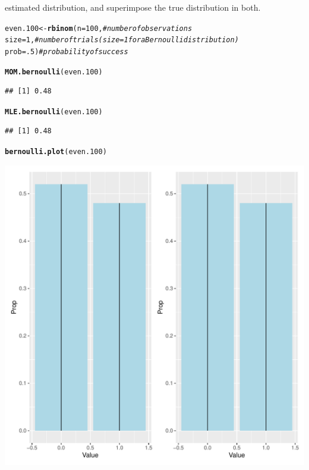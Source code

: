 \documentclass{article}\usepackage[]{graphicx}\usepackage[]{color}
\makeatletter
\def\maxwidth{ %
  \ifdim\Gin@nat@width>\linewidth
    \linewidth
  \else
    \Gin@nat@width
  \fi
}
\newcommand{\hlnum}[1]{\textcolor[rgb]{0.686,0.059,0.569}{#1}}%
\newcommand{\hlcom}[1]{\textcolor[rgb]{0.678,0.584,0.686}{\textit{#1}}}%
\newcommand{\hlstd}[1]{\textcolor[rgb]{0.345,0.345,0.345}{#1}}%
\newcommand{\hlkwb}[1]{\textcolor[rgb]{0.69,0.353,0.396}{#1}}%
\newcommand{\hlkwc}[1]{\textcolor[rgb]{0.333,0.667,0.333}{#1}}%
\newcommand{\hlkwd}[1]{\textcolor[rgb]{0.737,0.353,0.396}{\textbf{#1}}}%
\newenvironment{kframe}{%
 \def\at@end@of@kframe{}%
 \ifinner\ifhmode%
  \def\at@end@of@kframe{\end{minipage}}%
  \begin{minipage}{\columnwidth}%
 \fi\fi%
 \def\FrameCommand##1{\hskip\@totalleftmargin \hskip-\fboxsep
 \colorbox{shadecolor}{##1}\hskip-\fboxsep
     \hskip-\linewidth \hskip-\@totalleftmargin \hskip\columnwidth}%
 \MakeFramed {\advance\hsize-\width
   \@totalleftmargin\z@ \linewidth\hsize
   \@setminipage}}%
 {\par\unskip\endMakeFramed%
 \at@end@of@kframe}
\newenvironment{knitrout}{}{} %
\makeatother
\begin{document}
\begin{enumerate}
\begin{enumerate}
  estimated distribution, and superimpose the true distribution in both.
\begin{knitrout}
\color{fgcolor}\begin{kframe}
\begin{alltt}
\hlstd{even.100} \hlkwb{<-} \hlkwd{rbinom}\hlstd{(}\hlkwc{n}\hlstd{=}\hlnum{100}\hlstd{,}        \hlcom{#number of observations}
                  \hlkwc{size}\hlstd{=}\hlnum{1}\hlstd{,}        \hlcom{#number of trials (size=1 for a Bernoulli distribution)}
                  \hlkwc{prob}\hlstd{=}\hlnum{.5}\hlstd{)}       \hlcom{#probability of success}

\hlkwd{MOM.bernoulli}\hlstd{(even.100)}
\end{alltt}
\begin{verbatim}
## [1] 0.48
\end{verbatim}
\begin{alltt}
\hlkwd{MLE.bernoulli}\hlstd{(even.100)}
\end{alltt}
\begin{verbatim}
## [1] 0.48
\end{verbatim}
\begin{alltt}
\hlkwd{bernoulli.plot}\hlstd{(even.100)}
\end{alltt}
\end{kframe}
\includegraphics[width=\maxwidth]{figure/unnamed-chunk-6-1} 
\end{knitrout}


\end{enumerate}
\end{enumerate}
\end{document}
